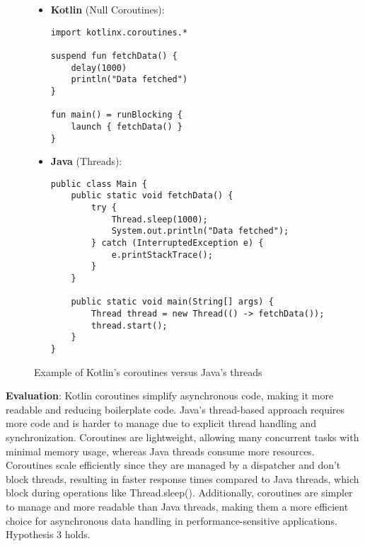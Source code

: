 \begin{figure}[H]
\centering
	
\begin{tcolorbox}[colframe=blue!80!black, colback=blue!5!white, coltitle=blue!50!black, title={-}, boxrule=0.5mm, width=0.8\textwidth, sharp corners=south]
    \begin{itemize}
    \vspace{0.2cm}
        \item \textbf{\scriptsize Kotlin} \scriptsize (Null Coroutines):
        \begin{lstlisting}[style=kotlin, basicstyle=\tiny\ttfamily]
import kotlinx.coroutines.*

suspend fun fetchData() {
    delay(1000)
    println("Data fetched")
}

fun main() = runBlocking {
    launch { fetchData() }
}
        \end{lstlisting}
        
        \item \textbf{\scriptsize Java} \scriptsize (Threads):
        \begin{lstlisting}[style=java, basicstyle=\tiny\ttfamily]
public class Main {
    public static void fetchData() {
        try {
            Thread.sleep(1000);
            System.out.println("Data fetched");
        } catch (InterruptedException e) {
            e.printStackTrace();
        }
    }

    public static void main(String[] args) {
        Thread thread = new Thread(() -> fetchData());
        thread.start();
    }
}
        \end{lstlisting}
    \end{itemize}
\end{tcolorbox}
\caption{Example of Kotlin's coroutines versus Java's threads}
\label{coroutines_threads}
\end{figure}

\noindent \textbf{Evaluation}: Kotlin coroutines simplify asynchronous code, making it more readable and reducing boilerplate code. Java’s thread-based approach requires more code and is harder to manage due to explicit thread handling and synchronization. Coroutines are lightweight, allowing many concurrent tasks with minimal memory usage, whereas Java threads consume more resources. Coroutines scale efficiently since they are managed by a dispatcher and don't block threads, resulting in faster response times compared to Java threads, which block during operations like Thread.sleep(). Additionally, coroutines are simpler to manage and more readable than Java threads, making them a more efficient choice for asynchronous data handling in performance-sensitive applications. Hypothesis 3 holds.

